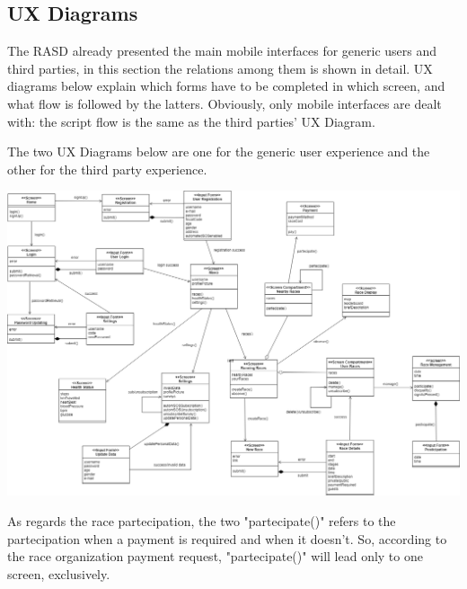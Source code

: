 \subsection{UX Diagrams}

The RASD already presented the main mobile interfaces for generic users and third parties, in this section the relations among them is shown in detail. UX diagrams below explain which forms have to be completed in which screen, and what flow is followed by the latters. Obviously, only mobile interfaces are dealt with: the script flow is the same as the third parties' UX Diagram.

\bigskip
The two UX Diagrams below are one for the generic user experience and the other for the third party experience.
\bigskip

\begin{center}
\includegraphics[scale=0.3]{sections/diagrams/UX}
\newline
{}
\end{center}

As regards the race partecipation, the two "partecipate()" refers to the partecipation when a payment is required and when it doesn't. So, according to the race organization payment request, "partecipate()" will lead only to one screen, exclusively.

